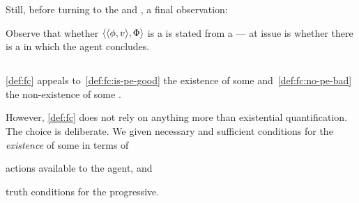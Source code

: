 \begin{note}
  Still, before turning to the  and , a final observation:

  Observe that whether \(\langle \langle \phi, v \rangle, \Phi \rangle\) is a  is stated from a  --- at issue is whether there is a \pevent{} in which the agent concludes.
\end{note}

\subsection{}
\label{cha:sec:fcs-def:potential-events}

\begin{note}
  \autoref{def:fc} appeals to~\ref{def:fc:is-pe-good} the existence of some \pevent{} and~\ref{def:fc:no-pe-bad} the non-existence of some \pevent{}.

  However, \autoref{def:fc} does not rely on anything more than existential quantification.
  The choice is deliberate.
  We given necessary and sufficient conditions for the \emph{existence} of some \pevent{} in terms of
  \begin{enumerate*}[label=(\roman*)]
  \item
    actions available to the agent, and
  \item
    truth conditions for the progressive.
  \end{enumerate*}
\end{note}

